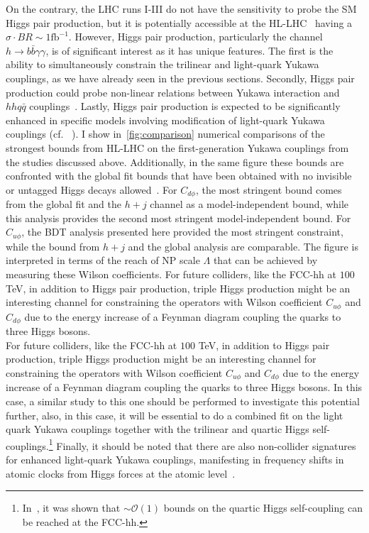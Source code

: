 On the contrary, the LHC runs I-III do not have the sensitivity to probe the SM Higgs pair production, but it is potentially accessible at the HL-LHC~\cite{Binoth:2006ym} having a $ \sigma \cdot BR\sim 1\mathrm{fb}^{-1}$. However, Higgs pair production, particularly the channel~$h \to b \bar b \gamma \gamma $, is of significant interest as it has unique features. The first is the ability to simultaneously constrain the trilinear and light-quark Yukawa couplings, as we have already seen in the previous sections. Secondly, Higgs pair production could probe non-linear relations between Yukawa interaction and~$hh q\bar q$ couplings~\cite{Contino:2012xk}. Lastly, Higgs pair production is expected to be significantly enhanced in specific models involving modification of light-quark Yukawa couplings (cf. ~\cite{Bar-Shalom:2018rjs,Bauer:2017cov,Egana-Ugrinovic:2021uew}).
I show in~\autoref{fig:comparison} numerical comparisons of the strongest bounds from HL-LHC on the first-generation Yukawa couplings from the studies discussed above. Additionally, in the same figure these bounds are confronted with the global fit bounds that have been obtained with no invisible or untagged Higgs decays allowed~\cite{deBlas:2019rxi}. For $C_{d\phi}$, the most stringent bound comes from the global fit and the $h+j$ channel as a model-independent bound, while this analysis provides the second most stringent model-independent bound. For $C_{u\phi}$, the BDT analysis presented here provided the most stringent constraint, while the bound from $h+j$ and the global analysis are comparable. The figure is interpreted in terms of the reach of NP scale $\Lambda$ that can be achieved by measuring these Wilson coefficients. For future colliders, like the FCC-hh at $100$ TeV, in addition to Higgs pair production, triple Higgs production might be an interesting channel for constraining the operators with Wilson coefficient $C_{u\phi}$ and $C_{d\phi}$ due to the energy increase of a Feynman diagram coupling the quarks to three Higgs bosons.\\
For future colliders, like the FCC-hh at $100$ TeV, in addition to Higgs pair production, triple Higgs production might be an interesting channel for constraining the operators with Wilson coefficient $C_{u\phi}$ and $C_{d\phi}$ due to the energy increase of a Feynman diagram coupling the quarks to three Higgs bosons.   In this case, a similar study to this one should be performed to investigate this potential further, also, in this case, it will be essential to do a combined fit on the light quark Yukawa couplings together with the trilinear and quartic Higgs self-couplings.\footnote{In~\cite{Papaefstathiou:2047255}, it was shown that $\sim \mathcal{O}(1)$ bounds on the quartic Higgs self-coupling can be reached at the FCC-hh.}
Finally, it should be noted that there are also non-collider signatures for enhanced light-quark Yukawa couplings, manifesting in frequency shifts in atomic clocks from Higgs forces at the atomic level~\cite{Delaunay:2016brc}. 
